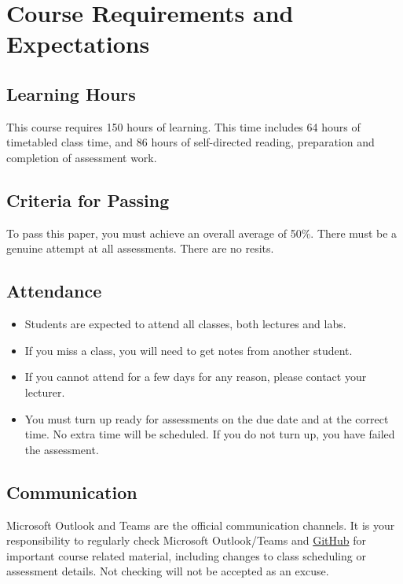 \documentclass{article}
\begin{document}
\section*{Course Requirements and Expectations}

\subsection*{Learning Hours}
This course requires 150 hours of learning. This time includes 64 hours of timetabled class time, and 86 hours of self-directed reading, preparation and completion of assessment work.

\subsection*{Criteria for Passing}
To pass this paper, you must achieve an overall average of 50\%. There must be a genuine attempt at all assessments. There are no resits.

\subsection*{Attendance}
\begin{itemize}
  \item Students are expected to attend all classes, both lectures and labs.
  \item If you miss a class, you will need to get notes from another student.
  \item If you cannot attend for a few days for any reason, please contact your lecturer.
  \item You must turn up ready for assessments on the due date and at the correct time. No extra time will be scheduled. If you do not turn up, you have failed the assessment.
\end{itemize}

\subsection*{Communication}
Microsoft Outlook and Teams are the official communication channels. It is your responsibility to regularly check Microsoft Outlook/Teams and \href{https://github.com/Grayson-Orr/Course-Files}{GitHub} for important course related material, including changes to class scheduling or assessment details. Not checking will not be accepted as an excuse.
\end{document}
